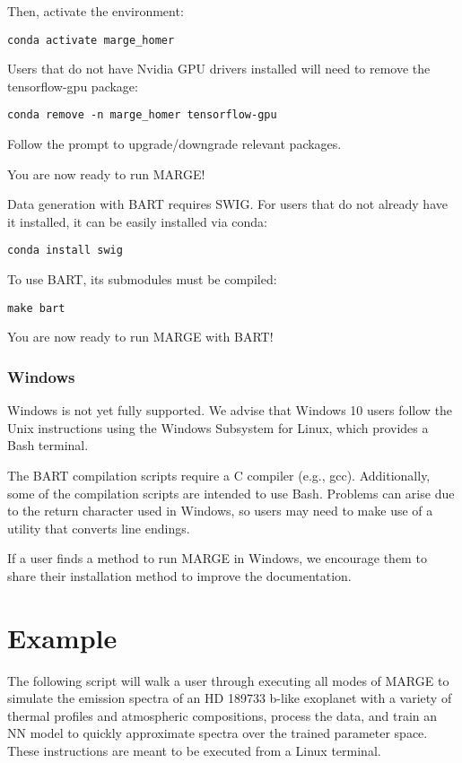 \documentclass[letterpaper, 12pt]{article}
\begin{document}
\noindent Then, activate the environment:
\begin{verbatim}
conda activate marge_homer
\end{verbatim}

\noindent Users that do not have Nvidia GPU drivers installed will need to 
remove the tensorflow-gpu package:
\begin{verbatim}
conda remove -n marge_homer tensorflow-gpu
\end{verbatim}
\noindent Follow the prompt to upgrade/downgrade relevant packages.

\noindent You are now ready to run MARGE!

\noindent Data generation with BART requires SWIG.  For users that do not 
already have it installed, it can be easily installed via conda:
\begin{verbatim}
conda install swig
\end{verbatim}

\noindent To use BART, its submodules must be compiled:
\begin{verbatim}
make bart
\end{verbatim}

\noindent You are now ready to run MARGE with BART!


\subsubsection{Windows}

\noindent Windows is not yet fully supported.  We advise that Windows 10 users 
follow the Unix instructions using the Windows Subsystem for Linux, which 
provides a Bash terminal.

\noindent The BART compilation scripts require a C compiler (e.g., gcc).  
Additionally, some of the compilation scripts are intended to use Bash.  
Problems can arise due to the return character used in Windows, so users may 
need to make use of a utility that converts line endings.  

\noindent If a user finds a method to run MARGE in Windows, we encourage them 
to share their installation method to improve the documentation.



\section{Example}
\label{sec:example}

\noindent The following script will walk a user through executing all modes of 
MARGE to simulate the emission spectra of an HD 189733 b-like exoplanet with a 
variety of thermal profiles and atmospheric compositions, process the data, and 
train an NN model to quickly approximate spectra over the trained parameter 
space.  These instructions are meant to be executed from a Linux terminal.  
\end{document}
